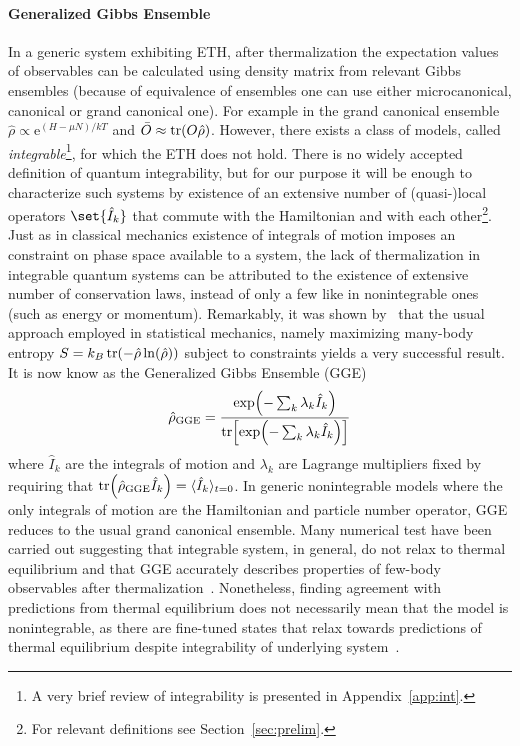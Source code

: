 \paragraph{Generalized Gibbs Ensemble}In a generic system exhibiting ETH, after thermalization the expectation values
of observables can be calculated using density matrix from relevant Gibbs ensembles
(because of equivalence of ensembles one can use either microcanonical, canonical or
grand canonical one).
For example in the grand canonical ensemble \(\hat{\rho} \propto \mathrm{e}^{(H-\mu N)/kT}\)
and \(\bar{O}\approx \tr(O \hat{\rho})\).
However, there exists a class of models, called \textit{integrable}\footnote{A very brief review of integrability is presented in Appendix~\ref{app:int}.},
for which the ETH does not hold. There is no widely accepted definition of quantum
integrability, but for our purpose it will be enough to characterize such systems by
existence of an extensive number of (quasi-)local operators \(\set{\hat{I}_k}\) that commute with
the Hamiltonian and with each  other\footnote{For relevant definitions see Section~\ref{sec:prelim}.}.
Just as in classical mechanics existence of integrals of motion imposes an constraint on phase
space available to a system, the lack of thermalization in integrable quantum systems can be
attributed to the existence of extensive number of conservation laws, instead of only a few like
in nonintegrable ones (such as energy or momentum). Remarkably, it was shown by~\textcite{Rigol2007}
that the usual approach employed in statistical mechanics, namely maximizing many-body entropy
\(S = k_B \tr(-\hat{\rho}\ln(\hat{\rho}))\) subject to constraints yields a very successful result.
It is now know as the Generalized Gibbs Ensemble (GGE)
\begin{equation}
    \hat{\rho}_{\mathrm{GGE}} = \frac{\exp({-\sum_k \lambda_k \hat{I}_k})}{
        \tr[\exp({-\sum_k \lambda_k \hat{I}_k})]}  
\end{equation}
where \(\hat{I}_k\) are the integrals of motion and \(\lambda_k\) are Lagrange multipliers fixed
by requiring that \(\tr(\hat{\rho}_{\mathrm{GGE}}\hat{I}_k) = \langle \hat{I}_k\rangle_{t=0}\).
In generic nonintegrable models where the only integrals of motion are the Hamiltonian and
particle number operator, GGE reduces to the usual grand canonical ensemble. 
Many numerical test have been carried out suggesting that integrable system, in general, do not
relax to thermal equilibrium and that GGE accurately describes properties of few-body
 observables after thermalization~\autocite{Cassidy2011,Rigol2007,Vidmar2016,Cazalilla2006}.
Nonetheless, finding agreement with predictions from thermal equilibrium does not necessarily
mean that the model is nonintegrable, as there are fine-tuned states that relax towards
predictions of thermal equilibrium despite integrability of underlying 
system~\autocite{Rigol2012,Rigol2011a,He2012}. 

